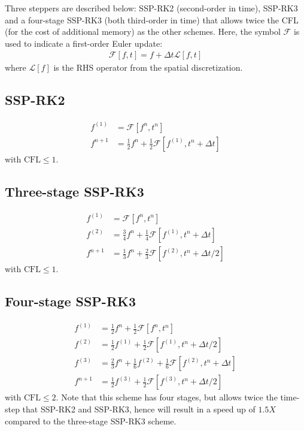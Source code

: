 \documentclass[12pt]{article}
\theoremstyle{definition}
\theoremstyle{definition}
\theoremstyle{definition}
\begin{document}
Three steppers are described below: SSP-RK2 (second-order in time),
SSP-RK3 and a four-stage SSP-RK3 (both third-order in time) that
allows twice the CFL (for the cost of additional memory) as the other
schemes. Here, the symbol $\mathcal{F}$ is used to indicate a
first-order Euler update:
\begin{align}
     \mathcal{F}[f,t] = f + \Delta t \mathcal{L}[f,t]
\end{align}
where $\mathcal{L}[f]$ is the RHS operator from the spatial
discretization.

\subsection*{SSP-RK2}

\begin{align}
   f^{(1)} &= \mathcal{F}[f^{n},t^n] \\
   f^{n+1} &= \frac{1}{2} f^{n} + \frac{1}{2}\mathcal{F}[f^{(1)},t^n+\Delta t]  
\end{align}
with $\mathrm{CFL}\le 1$.

\subsection*{Three-stage SSP-RK3}

\begin{align}
   f^{(1)} &= \mathcal{F}[f^{n},t^n] \\
   f^{(2)} &= \frac{3}{4} f^{n} + \frac{1}{4}\mathcal{F}[f^{(1)},t^n+\Delta t ] \\
   f^{n+1} &= \frac{1}{3} f^{n} + \frac{2}{3}\mathcal{F}[f^{(2)},t^n+\Delta t/2]  
\end{align}
with $\mathrm{CFL}\le 1$.

\subsection*{Four-stage SSP-RK3}

\begin{align}
   f^{(1)} &= \frac{1}{2} f^{n} + \frac{1}{2} \mathcal{F}[f^{n},t^n] \\
   f^{(2)} &= \frac{1}{2} f^{(1)} + \frac{1}{2} \mathcal{F}[f^{(1)},t^n+\Delta t/2] \\
   f^{(3)} &= \frac{2}{3} f^{n} + \frac{1}{6} f^{(2)} + \frac{1}{6} \mathcal{F}[f^{(2)},t^n+\Delta t] \\
   f^{n+1} &= \frac{1}{2} f^{(3)} + \frac{1}{2} \mathcal{F}[f^{(3)},t^n+\Delta t/2]
\end{align}
with $\mathrm{CFL}\le 2$. Note that this scheme has four stages, but
allows twice the time-step that SSP-RK2 and SSP-RK3, hence will result
in a speed up of $1.5X$ compared to the three-stage SSP-RK3
scheme.
\end{document}
